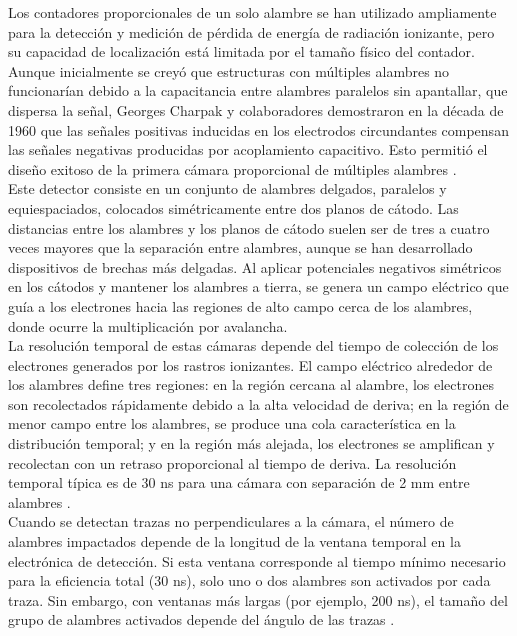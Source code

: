 \documentclass{article}
\begin{document}
\noindent Los contadores proporcionales de un solo alambre se han utilizado ampliamente para la detección y medición de pérdida de energía de radiación ionizante, pero su capacidad de localización está limitada por el tamaño físico del contador. Aunque inicialmente se creyó que estructuras con múltiples alambres no funcionarían debido a la capacitancia entre alambres paralelos sin apantallar, que dispersa la señal, Georges Charpak y colaboradores demostraron en la década de 1960 que las señales positivas inducidas en los electrodos circundantes compensan las señales negativas producidas por acoplamiento capacitivo. Esto permitió el diseño exitoso de la primera cámara proporcional de múltiples alambres \cite{charpak1968use}.\\

\noindent Este detector consiste en un conjunto de alambres delgados, paralelos y equiespaciados, colocados simétricamente entre dos planos de cátodo. Las distancias entre los alambres y los planos de cátodo suelen ser de tres a cuatro veces mayores que la separación entre alambres, aunque se han desarrollado dispositivos de brechas más delgadas. Al aplicar potenciales negativos simétricos en los cátodos y mantener los alambres a tierra, se genera un campo eléctrico que guía a los electrones hacia las regiones de alto campo cerca de los alambres, donde ocurre la multiplicación por avalancha.\\

\noindent La resolución temporal de estas cámaras depende del tiempo de colección de los electrones generados por los rastros ionizantes. El campo eléctrico alrededor de los alambres define tres regiones: en la región cercana al alambre, los electrones son recolectados rápidamente debido a la alta velocidad de deriva; en la región de menor campo entre los alambres, se produce una cola característica en la distribución temporal; y en la región más alejada, los electrones se amplifican y recolectan con un retraso proporcional al tiempo de deriva. La resolución temporal típica es de 30 ns para una cámara con separación de 2 mm entre alambres \cite{sauli1977principles}.\\

\noindent Cuando se detectan trazas no perpendiculares a la cámara, el número de alambres impactados depende de la longitud de la ventana temporal en la electrónica de detección. Si esta ventana corresponde al tiempo mínimo necesario para la eficiencia total (30 ns), solo uno o dos alambres son activados por cada traza. Sin embargo, con ventanas más largas (por ejemplo, 200 ns), el tamaño del grupo de alambres activados depende del ángulo de las trazas \cite{sauli1977principles}.\\
\end{document}
